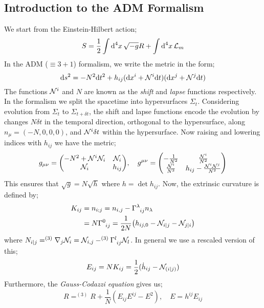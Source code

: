 \subsection{Introduction to the ADM Formalism}
We start from the Einstein-Hilbert action;
\begin{equation*}
S = \frac{1}{2}\int{\text{d}^4 x \,\sqrt{-g}R} + \int{\text{d}^4 x \,\mathcal{L}_{m}}
\end{equation*}
In the ADM ($\equiv 3 + 1$) formalism, we write the metric in the form;
\begin{equation}
\text{d} s^2 = - N^2 \text{d} t^2 + h_{ij}(\text{d} x^{i} + \mathcal{N}^{i}\text{d} t)(\text{d} x^{j} + \mathcal{N}^{j}\text{d} t)
\end{equation}
The functions $\mathcal{N}^{i}$ and $N$ are known as the \emph{shift} and \emph{lapse} functions respectively. In the formalism we split the spacetime into hypersurfaces $\Sigma_t$. Considering evolution from $\Sigma_t$ to $\Sigma_{t + \delta t}$, the shift and lapse functions encode the evolution by changes $N\delta t$ in the temporal direction, orthogonal to the hypersurface, along $n_{\mu} = (-N, 0, 0, 0)$, and $\mathcal{N}^{i} \delta t$ within the hypersurface. Now raising and lowering indices with $h_{ij}$ we have the metric;
\begin{equation}
g_{\mu\nu} = \twobytwo{-N^2 + \mN^{i}\mN_i}{\mN_{i}}{\mN_{i}}{h_{ij}}, \quad g^{\mu\nu} = \twobytwo{-\frac{1}{N^2}}{\frac{\mN^{i}}{N^2}}{\frac{\mN^{i}}{N^2}}{h_{ij} - \frac{\mN^{i}\mN^{j}}{N^2}}
\end{equation} 
This ensures that $\sqrt{g} = N\sqrt{h}$ where $h = \det h_{ij}$. Now, the extrinsic curvature is defined by;
\begin{align*}
K_{ij} &= n_{i;j} = n_{i, j} - \Gamma\indices{^{\lambda}_{ij}}n_{\lambda} \\
&= N \Gamma\indices{^{0}_{ij}} = \frac{1}{2N}\left(h_{ij,0} - \mN_{i | j} - \mN_{j | i}\right)
\end{align*}
where $N_{i|j} = ^{(3)}\nabla_j \mN_{i} = \mN_{i, j} - ^{(3)}\Gamma\indices{^{l}_{ij}}\mN_{l}$. In general we use a rescaled version of this;
\begin{equation*}
E_{ij} = N K_{ij} = \frac{1}{2}(\dot{h}_{ij} - \mathcal{N}_{(i|j)})
\end{equation*}
Furthermore, the \emph{Gauss-Codazzi equation} gives us;
\begin{equation}
R = ^{(3)}R + \frac{1}{N}(E_{ij}E^{ij} - E^2), \quad E = h^{ij}E_{ij}
\end{equation}
